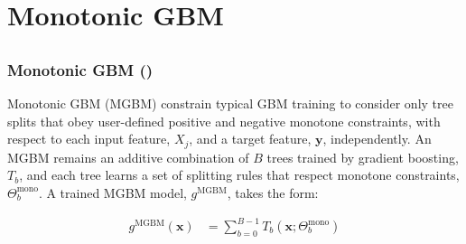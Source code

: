 \documentclass[11pt,aspectratio=169,hyperref={colorlinks}]{beamer}
\begin{document}
	\section{Monotonic GBM}

	\subsection*{}
	
	\begin{frame}
	
		\frametitle{Monotonic GBM (\cite{rml_workflow})}

			Monotonic GBM (MGBM) constrain typical GBM training to consider only tree splits that obey user-defined positive and negative monotone constraints, with respect to each input feature, $X_j$, and a target feature, $\mathbf{y}$, independently. An MGBM remains an additive combination of $B$ trees trained by gradient boosting, $T_b$, and each tree learns a set of splitting rules that respect monotone constraints,  $\Theta^\text{mono}_b$. A trained MGBM model, $g^{\text{MGBM}}$, takes the form:
			
			\begin{equation}
			\begin{aligned}\label{eq:gbm}
			g^{\text{MGBM}}(\mathbf{x}) &= \sum_{b=0}^{B-1} T_b\left(\mathbf{x}; \Theta^\text{mono}_b\right)
			\end{aligned}
			\end{equation}
		
	\end{frame}
\end{document}
